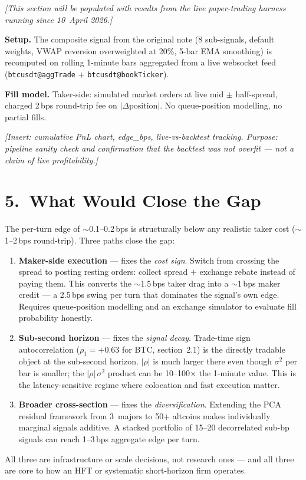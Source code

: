 \documentclass[10pt,a4paper]{article}
\begin{document}
\textit{[This section will be populated with results from the live paper-trading
harness running since 10~April 2026.]}

\medskip\noindent
\textbf{Setup.} The composite signal from the original note (8 sub-signals,
default weights, VWAP reversion overweighted at 20\%, 5-bar EMA smoothing)
is recomputed on rolling 1-minute bars aggregated from a live websocket feed
(\texttt{btcusdt@aggTrade} + \texttt{btcusdt@bookTicker}).

\textbf{Fill model.} Taker-side: simulated market orders at live mid
$\pm$ half-spread, charged 2\,bps round-trip fee on $|\Delta\text{position}|$.
No queue-position modelling, no partial fills.

\medskip
\textit{[Insert: cumulative PnL chart, edge\_bps, live-vs-backtest tracking.
Purpose: pipeline sanity check and confirmation that the backtest was not
overfit --- not a claim of live profitability.]}

\section*{5.\ What Would Close the Gap}

The per-turn edge of $\sim$0.1--0.2\,bps is structurally below any
realistic taker cost ($\sim$1--2\,bps round-trip). Three paths close the gap:

\begin{enumerate}[leftmargin=1.5em, itemsep=1pt, topsep=2pt]
  \item \textbf{Maker-side execution} --- fixes the \emph{cost sign}.
        Switch from crossing the spread to posting resting orders: collect
        spread $+$ exchange rebate instead of paying them. This converts the
        $\sim$1.5\,bps taker drag into a $\sim$1\,bps maker credit --- a
        2.5\,bps swing per turn that dominates the signal's own edge.
        Requires queue-position modelling and an exchange simulator to
        evaluate fill probability honestly.
  \item \textbf{Sub-second horizon} --- fixes the \emph{signal decay}.
        Trade-time sign autocorrelation ($\rho_1 = +0.63$ for BTC,
        section~2.1) is the directly tradable object at the sub-second
        horizon. $|\rho|$ is much larger there even though $\sigma^2$ per
        bar is smaller; the $|\rho|\,\sigma^2$ product can be
        10--100$\times$ the 1-minute value. This is the
        latency-sensitive regime where colocation and fast execution
        matter.
  \item \textbf{Broader cross-section} --- fixes the \emph{diversification}.
        Extending the PCA residual framework from 3~majors to 50+ altcoins
        makes individually marginal signals additive. A stacked portfolio
        of 15--20 decorrelated sub-bp signals can reach 1--3\,bps
        aggregate edge per turn.
\end{enumerate}

\noindent
All three are infrastructure or scale decisions, not research ones ---
and all three are core to how an HFT or systematic short-horizon firm
operates.
\end{document}
